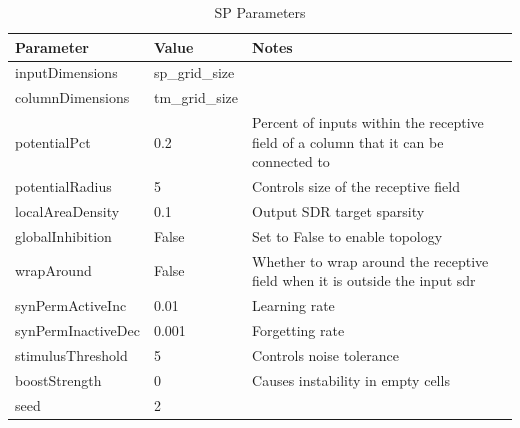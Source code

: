 \begin{table}[H]
    \centering
    \begin{tabularx}{\linewidth}{@{}XlX@{}}
        \toprule
        \textbf{Parameter} & \textbf{Value} & \textbf{Notes}                                                                       \\
        \midrule
        inputDimensions    & sp\_grid\_size &                                                                                      \\
        columnDimensions   & tm\_grid\_size &                                                                                      \\
        potentialPct       & 0.2            & Percent of inputs within the receptive field of a column that it can be connected to \\
        potentialRadius    & 5              & Controls size of the receptive field                                                 \\
        localAreaDensity   & 0.1            & Output SDR target sparsity                                                           \\
        globalInhibition   & False          & Set to False to enable topology                                                      \\
        wrapAround         & False          & Whether to wrap around the receptive field when it is outside the input \gls*{sdr}   \\
        synPermActiveInc   & 0.01           & Learning rate                                                                        \\
        synPermInactiveDec & 0.001          & Forgetting rate                                                                      \\
        stimulusThreshold  & 5              & Controls noise tolerance                                                             \\
        boostStrength      & 0              & Causes instability in empty cells                                                    \\
        seed               & 2              &                                                                                      \\
        \bottomrule
    \end{tabularx}
    \caption{SP Parameters}
    \label{tab:sperm_sp_param}
\end{table}
